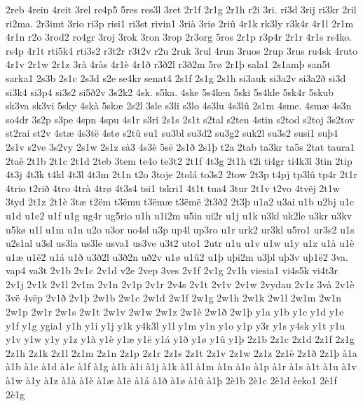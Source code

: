 {2reb
4rein
4reit
3rel
re4p5
5res
res3l
3ret
2r1f
2r1g
2r1h
r2i
3ri.
ri3d
3rij
ri3kr
2ril
ri2ma.
2r3imt
3rio
ri3p
risi1
ri3st
rivin1
3ri^^e0
3ri^^f8
2ri^^fb
4r1k
rk3ly
r3k4r
4r1l
2r1m
4r1n
r2o
3rod2
ro4gr
3roj
3rok
3ron
3rop
2r3org
5ros
2r1p
r3p4r
2r1r
4r1s
rs4ko.
rs4p
4r1t
rti5k4
rti3s2
r3t2r
r3t2v
r2u
2ruk
3rul
4run
3ruos
2rup
3rus
ru4sk
4ruto
4r1v
2r1w
2r1z
3r^^e0
4r^^e0s
4r1^^e8
4r1^^f0
r3^^f02l
r3^^f02m
5r^^f8
2r1^^fe
sala1
2s1am^^fe
san5t
sarka1
2s3b
2s1c
2s3d
s2e
se4kr
senat4
2s1f
2s1g
2s1h
si3auk
si3a2v
si3a2^^f0
si3d
si3k4
si3p4
si3s2
si5^^f02v
3s2k2
4sk.
s5ka.
4ske
5s4ken
5ski
5s4kle
5sk4r
5skub
sk3va
sk3vi
5sky
4sk^^e0
5sk^^e6
2s2l
3sle
s3li
s3lo
4s3lu
4s3l^^fb
2s1m
4sme.
4sm^^e6
4s3n
so4dr
3s2p
s3pe
4spn
4spu
4s1r
s3ri
2s1s
2s1t
s2tal
s2ten
4stin
s2tod
s2toj
3s2tov
st2rai
st2v
4st^^e6
4s3t^^eb
4st^^f8
s2t^^fb
su1
su3bl
su3d2
su3g2
suk2l
su3s2
susi1
su^^fe4
2s1v
s2ve
3s2vy
2s1w
2s1z
s^^e03
4s3^^e8
5s^^eb
2s1^^f0
2s1^^fe
t2a
2tab
ta3kr
ta5s
2tat
taura1
2ta^^e8
2t1b
2t1c
2t1d
2teb
3tem
te4o
te3t2
2t1f
4t3g
2t1h
t2i
ti4gr
ti4k3l
3tin
2tip
4t3j
4t3k
t4kl
4t3l
4t3m
2t1n
t2o
3toje
2tol^^e1
to3s2
2tow
2t3p
t4pj
tp3l^^fb
tp4r
2t1r
4trio
t2ri^^f0
4tro
4tr^^e0
4tr^^f8
4t3s4
tsi1
tskri1
4t1t
tua4
3tur
2t1v
t2vo
4tv^^ebj
2t1w
3tyd
2t1z
2t1^^e8
3t^^e6
t2^^ebm
t3^^ebmu
t3^^ebm^^e6
t3^^ebm^^eb
2t3^^f02
2t3^^fe
u1a2
u3ai
u1b
u2bj
u1c
u1d
u1e2
u1f
u1g
ug4r
ug5rio
u1h
u1i2m
u5in
ui2r
u1j
u1k
u3kl
uk2le
u3kr
u3kv
u5k^^f8
u1l
u1m
u1n
u2o
u3or
uo4sl
u3p
up4l
up3ro
u1r
urk2
ur3kl
u5ro1
ur3s2
u1s
u2s1al
u3sl
us3la
us3le
usva1
us3ve
u3t2
uto1
2utr
u1u
u1v
u1w
u1y
u1z
u1^^e0
u1^^e8
u1^^e6
u1^^eb2
u1^^e1
u1^^f0
u3^^f02l
u3^^f02n
u^^f02v
u1^^f8
u1^^fb2
u1^^fe
u^^fei2m
u3^^fel
u^^fe3v
u^^fe1^^eb2
3va.
vap4
va3t
2v1b
2v1c
2v1d
v2e
2vep
3ves
2v1f
2v1g
2v1h
viesia1
vi4s5k
vi4t3r
2v1j
2v1k
2v1l
2v1m
2v1n
2v1p
2v1r
2v4s
2v1t
2v1v
2v1w
2vydau
2v1z
3v^^e0
2v1^^e8
3v^^eb
4v^^ebp
2v1^^f0
2v1^^fe
2w1b
2w1c
2w1d
2w1f
2w1g
2w1h
2w1k
2w1l
2w1m
2w1n
2w1p
2w1r
2w1s
2w1t
2w1v
2w1w
2w1z
2w1^^e8
2w1^^f0
2w1^^fe
y1a
y1b
y1c
y1d
y1e
y1f
y1g
ygia1
y1h
y1i
y1j
y1k
y4k3l
y1l
y1m
y1n
y1o
y1p
y3r
y1s
y4sk
y1t
y1u
y1v
y1w
y1y
y1z
y1^^e0
y1^^e8
y1^^e6
y1^^eb
y1^^e1
y1^^f0
y1^^f8
y1^^fb
y1^^fe
2z1b
2z1c
2z1d
2z1f
2z1g
2z1h
2z1k
2z1l
2z1m
2z1n
2z1p
2z1r
2z1s
2z1t
2z1v
2z1w
2z1z
2z1^^e8
2z1^^f0
2z1^^fe
^^e01a
^^e01b
^^e01c
^^e01d
^^e01e
^^e01f
^^e01g
^^e01h
^^e01i
^^e01j
^^e01k
^^e01l
^^e01m
^^e01n
^^e01o
^^e01p
^^e01r
^^e01s
^^e01t
^^e01u
^^e01v
^^e01w
^^e01y
^^e01z
^^e01^^e0
^^e01^^e8
^^e01^^e6
^^e01^^eb
^^e01^^e1
^^e01^^f0
^^e01^^f8
^^e01^^fb
^^e01^^fe
2^^e81b
2^^e81c
2^^e81d
^^e8eko1
2^^e81f
2^^e81g
}
